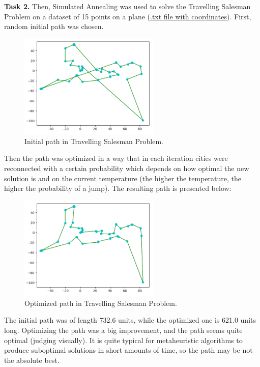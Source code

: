 \documentclass[12pt, a4paper]{article}
\begin{document}
\newpage

\textbf{Task 2.} Then, Simulated Annealing was used to solve the Travelling Salesman Problem on a dataset of 15 points on a plane (\href{https://github.com/Dormant512/itmo_lab_listings/blob/main/coords.txt}{.txt file with coordinates}). First, random initial path was chosen.

\vspace{-3mm}
\begin{figure}[!h]
\centering
\includegraphics[width=0.6\textwidth]{pic2.png}
\caption{Initial path in Travelling Salesman Problem.}
\end{figure}

Then the path was optimized in a way that in each iteration cities were reconnected with a certain probability which depends on how optimal the new solution is and on the current temperature (the higher the temperature, the higher the probability of a jump). The resulting path is presented below:

\begin{figure}[!h]
\centering
\includegraphics[width=0.6\textwidth]{pic3.png}
\caption{Optimized path in Travelling Salesman Problem.}
\end{figure}

The initial path was of length 732.6 units, while the optimized one is 621.0 units long. Optimizing the path was a big improvement, and the path seems quite optimal (judging visually). It is quite typical for metaheuristic algorithms to produce suboptimal solutions in short amounts of time, so the path may be not the absolute best.
\end{document}
